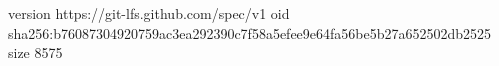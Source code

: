 version https://git-lfs.github.com/spec/v1
oid sha256:b76087304920759ac3ea292390c7f58a5efee9e64fa56be5b27a652502db2525
size 8575
